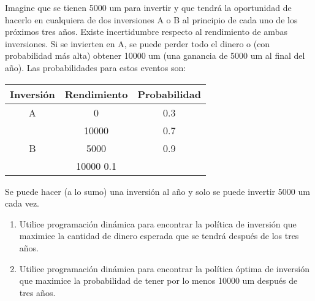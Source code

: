 \documentclass[twoside]{article}
\begin{document}
\newpage 
\begin{ejercicio}{7}
Imagine que se tienen 5000 um para invertir y que tendrá la oportunidad de hacerlo en cualquiera de dos inversiones A o B al principio de cada uno de los próximos tres años. Existe incertidumbre respecto al rendimiento de ambas inversiones. Si se invierten en A, se puede perder todo el dinero o (con probabilidad más alta) obtener 10000 um (una ganancia de 5000 um al final del año). Las probabilidades para estos eventos son:
\begin{tabular}{c| c c}
\hline
Inversión & Rendimiento & Probabilidad\\
\hline
A & 0 & 0.3\\
  & 10000 &  0.7\\
 \hline
 B & 5000 & 0.9\\
   & 10000 0.1\\
   \hline

\end{tabular}

\vspace{0.2cm}

Se puede hacer (a lo sumo) una inversión al año y solo se puede invertir 5000 um cada vez.
\begin{enumerate}
\item Utilice programación dinámica para encontrar la política de inversión que maximice la cantidad de dinero esperada que se tendrá después de los tres años.
\item Utilice programación dinámica para encontrar la política óptima de inversión que maximice la probabilidad de tener por lo menos 10000 um después de tres años.
\end{enumerate}
\end{ejercicio}
\end{document}
